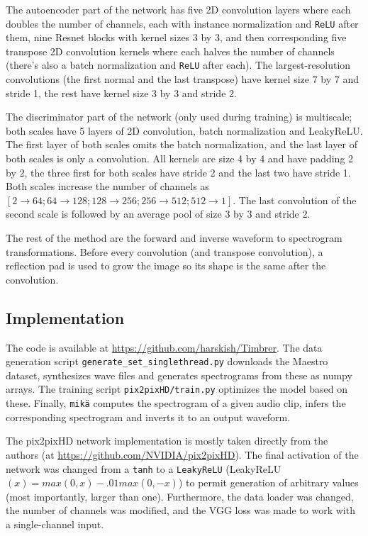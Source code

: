 \documentclass[12pt]{article}
\begin{document}
The autoencoder part of the network has five 2D convolution layers where each doubles the number of channels, each with instance normalization and \texttt{ReLU} after them, nine Resnet blocks with kernel sizes 3 by 3, and then corresponding five transpose 2D convolution kernels where each halves the number of channels (there's also a batch normalization and \texttt{ReLU} after each). The largest-resolution convolutions (the first normal and the last transpose) have kernel size 7 by 7 and stride 1, the rest have kernel size 3 by 3 and stride 2.

The discriminator part of the network (only used during training) is multiscale; both scales have 5 layers of 2D convolution, batch normalization and LeakyReLU. The first layer of both scales omits the batch normalization, and the last layer of both scales is only a convolution. All kernels are size 4 by 4 and have padding 2 by 2, the three first for both scales have stride 2 and the last two have stride 1. Both scales increase the number of channels as $[2\rightarrow 64;64\rightarrow 128;128\rightarrow 256;256\rightarrow 512;512\rightarrow 1]$. The last convolution of the second scale is followed by an average pool of size 3 by 3 and stride 2.

The rest of the method are the forward and inverse waveform to spectrogram transformations. Before every convolution (and transpose convolution), a reflection pad is used to grow the image so its shape is the same after the convolution.

\subsection{Implementation}
The code is available at \url{https://github.com/harskish/Timbrer}. The data generation script \texttt{generate\_set\_singlethread.py} downloads the Maestro dataset, synthesizes wave files and generates spectrograms from these as numpy arrays. The training script \texttt{pix2pixHD/train.py} optimizes the model based on these. Finally, \texttt{mikä} computes the spectrogram of a given audio clip, infers the corresponding spectrogram and inverts it to an output waveform.

The pix2pixHD network implementation is mostly taken directly from the authors (at \url{https://github.com/NVIDIA/pix2pixHD}). The final activation of the network was changed from a \texttt{tanh} to a \texttt{LeakyReLU} (LeakyReLU$(x) = max(0,x)-.01max(0,-x)$) to permit generation of arbitrary values (most importantly, larger than one). Furthermore, the data loader was changed, the number of channels was modified, and the VGG loss was made to work with a single-channel input.
\end{document}
